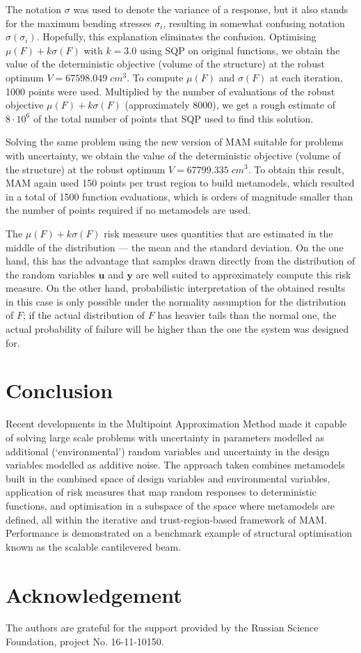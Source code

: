 \documentclass[10pt,twocolumn,a4paper]{article}
\begin{document}
The notation $\sigma$ was used to denote the variance of a response, but it also stands for the maximum bending stresses $\sigma_i$, resulting in somewhat confusing notation $\sigma(\sigma_i )$. Hopefully, this explanation eliminates the confusion. Optimising $\mu(F) + k\sigma(F)$ with $k = 3.0$ using SQP on original functions, we obtain the value of the deterministic objective (volume of the structure) at the robust optimum $V = 67598.049\; cm^3$. To compute $\mu(F)$ and $\sigma(F)$ at each iteration, 1000 points were used. Multiplied by the number of evaluations of the robust objective $\mu(F) + k\sigma(F)$ (approximately 8000), we get a rough estimate of $8\cdot 10^6$ of the total number of points that SQP used to find this solution.

Solving the same problem using the new version of MAM suitable for problems with uncertainty, we obtain the value of the deterministic objective (volume of the structure) at the robust optimum $V = 67799.335\; cm^3$. To obtain this result, MAM again used 150 points per trust region to build metamodels, which resulted in a total of 1500 function evaluations, which is orders of magnitude smaller than the number of points required if no metamodels are used.

The $\mu(F ) + k\sigma(F)$ risk measure uses quantities that are estimated in the middle of the distribution --- the mean and the standard deviation. On the one hand, this has the advantage that samples drawn directly from the distribution of the random variables $\pmb u$ and $\pmb y$ are well suited to approximately compute this risk measure. On the other hand, probabilistic interpretation of the obtained results in this case is only possible under the normality assumption for the distribution of $F$; if the actual distribution of $F$ has heavier tails than the normal one, the actual probability of failure will be higher than the one  the system was designed for.

\section{Conclusion}
\label{sec:conclusion}

Recent developments in the Multipoint Approximation Method made it capable of solving large scale problems with uncertainty in parameters modelled as additional (‘environmental’) random variables and uncertainty in the design variables modelled as additive noise. The approach taken combines metamodels built in the combined space of design variables and environmental variables, application of risk measures that map random responses to deterministic functions, and optimisation in a subspace of the space where metamodels are defined, all within the iterative and trust-region-based framework of MAM. Performance is demonstrated on a benchmark example of structural optimisation known as the scalable cantilevered beam.

\section*{Acknowledgement}
The authors are grateful for the support provided by the Russian Science Foundation, project No. 16-11-10150.

{}

\end{document}
